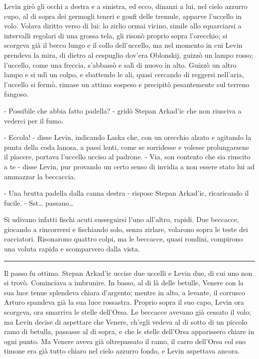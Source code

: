 Levin girò gli occhi a destra e a sinistra, ed ecco, dinanzi a lui, nel cielo azzurro cupo, al di sopra dei germogli teneri e gonfi delle tremule, apparve l'uccello in volo. Volava diritto verso di lui: lo zirlio ormai vicino, simile allo squarciarsi a intervalli regolari di una grossa tela, gli risonò proprio sopra l'orecchio; si scorgeva già il becco lungo e il collo dell'uccello, ma nel momento in cui Levin prendeva la mira, di dietro al cespuglio dov'era Oblonskij, guizzò un lampo rosso; l'uccello, come una freccia, s'abbassò e salì di nuovo in alto. Guizzò un altro lampo e si udì un colpo, e sbattendo le ali, quasi cercando di reggersi nell'aria, l'uccello si fermò, rimase un attimo sospeso e precipitò pesantemente sul terreno fangoso. 

- Possibile che abbia fatto padella? - gridò Stepan Arkad'ic che non riusciva a vederci per il fumo. 

- Eccola! - disse Levin, indicando Laska che, con un orecchio alzato e agitando la punta della coda lanosa, a passi lenti, come se sorridesse e volesse prolungarsene il piacere, portava l'uccello ucciso al padrone. - Via, son contento che sia riuscito a te - disse Levin, pur provando un certo senso di invidia a non essere stato lui ad ammazzar la beccaccia. 

- Una brutta padella dalla canna destra - rispose Stepan Arkad'ic, ricaricando il fucile. - Sst\ldots{} passano\ldots{} 

Si udivano infatti fischi acuti susseguirsi l'uno all'altro, rapidi. Due beccacce, giocando a rincorrersi e fischiando solo, senza zirlare, volarono sopra le teste dei cacciatori. Risonarono quattro colpi, ma le beccacce, quasi rondini, compirono una voluta rapida e scomparvero dalla vista. 

\begin{center}\rule{3in}{0.4pt}\end{center} 

Il passo fu ottimo. Stepan Arkad'ic uccise due uccelli e Levin due, di cui uno non si trovò. Cominciava a imbrunire. In basso, al di là delle betulle, Venere con la sua luce tenue splendeva chiara d'argento; mentre in alto, a levante, il corrusco Arturo spandeva già la sua luce rossastra. Proprio sopra il suo capo, Levin ora scorgeva, ora smarriva le stelle dell'Orsa. Le beccacce avevano già cessato il volo; ma Levin decise di aspettare che Venere, ch'egli vedeva al di sotto di un piccolo ramo di betulla, passasse al di sopra, e che le stelle dell'Orsa apparissero chiare in ogni punto. Ma Venere aveva già oltrepassato il ramo, il carro dell'Orsa col suo timone era già tutto chiaro nel cielo azzurro fondo, e Levin aspettava ancora. 

